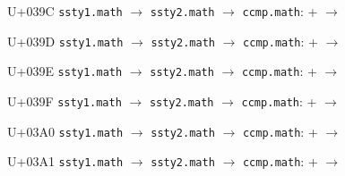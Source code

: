 \documentclass{article}
\begin{document}
\begin{substitutions}
\goodbreak

U+039C  \linebreak
    \texttt{ssty1.math} $\to$  \linebreak
    \texttt{ssty2.math} $\to$  \linebreak
\texttt{ccmp.math}:
\linebreak\null\quad{} \space +  \space $\to$  

\goodbreak

U+039D  \linebreak
    \texttt{ssty1.math} $\to$  \linebreak
    \texttt{ssty2.math} $\to$  \linebreak
\texttt{ccmp.math}:
\linebreak\null\quad{} \space +  \space $\to$  

\goodbreak

U+039E  \linebreak
    \texttt{ssty1.math} $\to$  \linebreak
    \texttt{ssty2.math} $\to$  \linebreak
\texttt{ccmp.math}:
\linebreak\null\quad{} \space +  \space $\to$  

\goodbreak

U+039F  \linebreak
    \texttt{ssty1.math} $\to$  \linebreak
    \texttt{ssty2.math} $\to$  \linebreak
\texttt{ccmp.math}:
\linebreak\null\quad{} \space +  \space $\to$  

\goodbreak

U+03A0  \linebreak
    \texttt{ssty1.math} $\to$  \linebreak
    \texttt{ssty2.math} $\to$  \linebreak
\texttt{ccmp.math}:
\linebreak\null\quad{} \space +  \space $\to$  

\goodbreak

U+03A1  \linebreak
    \texttt{ssty1.math} $\to$  \linebreak
    \texttt{ssty2.math} $\to$  \linebreak
\texttt{ccmp.math}:
\linebreak\null\quad{} \space +  \space $\to$  


\end{substitutions}
\end{document}
